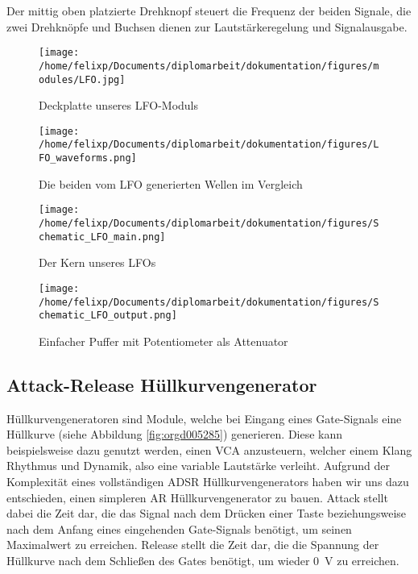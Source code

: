 Der mittig oben platzierte Drehknopf steuert die Frequenz der beiden Signale, die zwei Drehknöpfe und Buchsen dienen zur Lautstärkeregelung und Signalausgabe.

\begin{figure}[hp]
\centering
\texttt{[image: /home/felixp/Documents/diplomarbeit/dokumentation/figures/modules/LFO.jpg]}
\caption{Deckplatte unseres LFO-Moduls}
\end{figure}

\begin{figure}[hp]
\centering
\texttt{[image: /home/felixp/Documents/diplomarbeit/dokumentation/figures/LFO\_waveforms.png]}
\caption{\label{fig:orgf3757ff}Die beiden vom LFO generierten Wellen im Vergleich}
\end{figure}

\begin{figure}[hp]
\centering
\texttt{[image: /home/felixp/Documents/diplomarbeit/dokumentation/figures/Schematic\_LFO\_main.png]}
\caption{\label{fig:org70d90c6}Der Kern unseres LFOs}
\end{figure}

\begin{figure}[hp]
\centering
\texttt{[image: /home/felixp/Documents/diplomarbeit/dokumentation/figures/Schematic\_LFO\_output.png]}
\caption{\label{fig:orgb3d92df}Einfacher Puffer mit Potentiometer als Attenuator}
\end{figure}

\newpage
\subsection{Attack-Release Hüllkurvengenerator \label{AR}}
\label{sec:orgf03d3b3}
Hüllkurvengeneratoren sind Module, welche bei Eingang eines Gate-Signals eine Hüllkurve (siehe Abbildung \ref{fig:orgd005285}) generieren. Diese kann beispielsweise dazu genutzt werden, einen \ac{VCA} anzusteuern, welcher einem Klang Rhythmus und Dynamik, also eine variable Lautstärke verleiht. Aufgrund der Komplexität eines vollständigen \ac{ADSR} Hüllkurvengenerators haben wir uns dazu entschieden, einen simpleren \ac{AR} Hüllkurvengenerator zu bauen. Attack stellt dabei die Zeit dar, die das Signal nach dem Drücken einer Taste beziehungsweise nach dem Anfang eines eingehenden Gate-Signals benötigt, um seinen Maximalwert zu erreichen. Release stellt die Zeit dar, die die Spannung der Hüllkurve nach dem Schließen des Gates benötigt, um wieder \SI{0}{\volt} zu erreichen.

